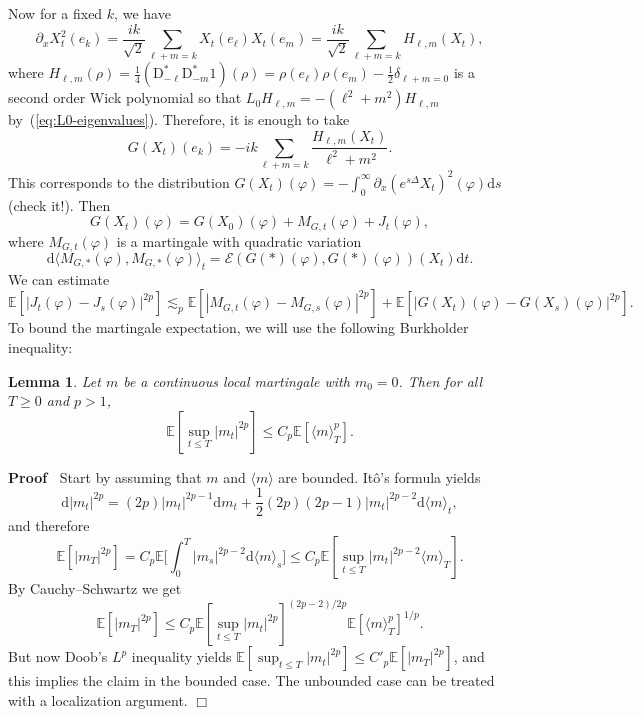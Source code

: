 \documentclass[a4paper,11pt]{article}
\newcommand{\mathD}{\mathrm{D}}
\newcommand{\mathd}{\mathrm{d}}
\newenvironment{proof}{\noindent\textbf{Proof\ }}{\hspace*{\fill}$\Box$\medskip}
\newtheorem{lemma}{Lemma}
{\theorembodyfont{\rmfamily}\newtheorem{remark}{Remark}}
\begin{document}
Now for a fixed $k$, we have
\begin{equation}\label{eq:square explicit}
   \partial_x X_t^2 (e_k) = \frac{ik}{\sqrt{2}} \sum_{\ell + m = k} X_t (e_{\ell}) X_t (e_m) = \frac{ik}{\sqrt{2}}  \sum_{\ell + m = k} H_{\ell, m} (X_t),
\end{equation}
where $H_{\ell, m} (\rho) = \frac{1}{4} (\mathD^{\ast}_{- \ell}
\mathD^{\ast}_{- m} 1) (\rho) = \rho (e_{\ell}) \rho (e_m) - \frac{1}{2}
\delta_{\ell + m = 0}$ is a second order Wick polynomial so that $L_0
H_{\ell, m} = - (\ell^2 + m^2) H_{\ell, m}$ by~(\ref{eq:L0-eigenvalues}).
Therefore, it is enough to take
\begin{equation}
  G (X_t) (e_k) = - ik \sum_{\ell + m = k} \frac{H_{\ell, m} (X_t)}{\ell^2 +
  m^2} .
\end{equation}
This corresponds to the distribution $G (X_t) (\varphi) = - \int_0^{\infty}
\partial_x (e^{s \Delta} X_t)^2 (\varphi) \mathd s$ (check it!). Then
\[ G (X_t) (\varphi) = G (X_0) (\varphi) + M_{G, t} (\varphi) + J_t (\varphi),
\]
where $M_{G, t} (\varphi)$ is a martingale with quadratic variation
\[ \mathd \langle M_{G, \ast} (\varphi), M_{G, \ast} (\varphi) \rangle_t
   =\mathcal{E} (G (\ast) (\varphi), G (\ast) (\varphi)) (X_t) \mathd t. \]
We can estimate
\[ \mathbb{E} [| J_t (\varphi) - J_s (\varphi) |^{2 p}] \lesssim_p
   \mathbb{E} [| M_{G, t} (\varphi) - M_{G, s} (\varphi) |^{2 p}]
   +\mathbb{E} [| G (X_t) (\varphi) - G (X_s) (\varphi) |^{2 p}] . \]
To bound the martingale expectation, we will use the following Burkholder
inequality:

\begin{lemma}
  Let $m$ be a continuous local martingale with $m_0 = 0$. Then for all $T
  \geqslant 0$ and $p > 1$,
  \[ \mathbb{E} [\sup_{t \leqslant T} | m_t |^{2 p}] \leqslant C_p
     \mathbb{E} [\langle m \rangle_T^p] . \]
\end{lemma}

\begin{proof}
  Start by assuming that $m$ and $\langle m \rangle$ are bounded. It{\^o}'s
  formula yields
  \[ \mathd | m_t |^{2 p} = (2 p) | m_t |^{2 p - 1} \mathd m_t + \frac{1}{2}
     (2 p) (2 p - 1) | m_t |^{2 p - 2} \mathd \langle m \rangle_t, \]
  and therefore
  \[ \mathbb{E} [| m_T |^{2 p}] = C_p \mathbb{E} \Big[ \int_0^T | m_s |^{2
     p - 2} \mathd \langle m \rangle_s \Big] \leqslant C_p \mathbb{E}
     [\sup_{t \leqslant T} | m_t |^{2 p - 2} \langle m \rangle_T] . \]
  By Cauchy--Schwartz we get
  \[ \mathbb{E} [| m_T |^{2 p}] \leqslant C_p \mathbb{E} [\sup_{t \leqslant
     T} | m_t |^{2 p}]^{(2 p - 2) / 2 p} \mathbb{E} [\langle m
     \rangle_T^p]^{1 / p} . \]
  But now Doob's $L^p$ inequality yields $\mathbb{E} [\sup_{t \leqslant T} |
  m_t |^{2 p}] \leqslant C'_p \mathbb{E} [| m_T |^{2 p}]$, and this implies
  the claim in the bounded case. The unbounded case can be treated with a
  localization argument. 
\end{proof}
\end{document}
